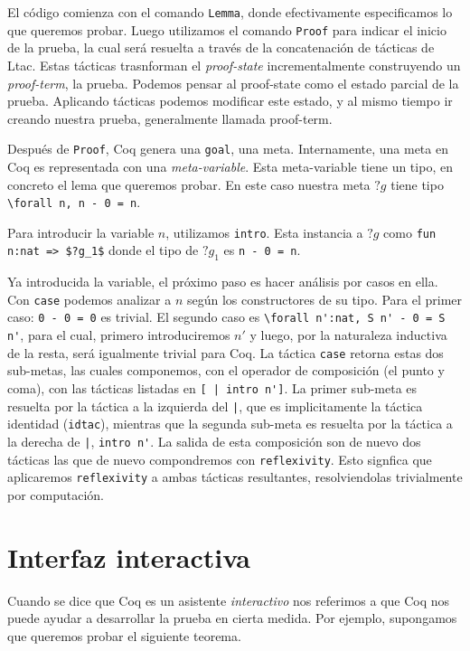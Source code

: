 El código comienza con el comando \lstinline{Lemma}, donde efectivamente especificamos lo que queremos probar.
Luego utilizamos el comando \lstinline{Proof} para indicar el inicio de la prueba, la cual será resuelta a través de la concatenación de tácticas de Ltac. Estas tácticas trasnforman el \textit{proof-state} incrementalmente construyendo un \textit{proof-term}, la prueba. Podemos pensar al proof-state como el estado parcial de la prueba. Aplicando tácticas podemos modificar este estado, y al mismo tiempo ir creando nuestra prueba, generalmente llamada proof-term.

Después de \lstinline{Proof}, Coq genera una \lstinline{goal}, una meta. Internamente, una meta en Coq es representada con una \textit{meta-variable}. Esta meta-variable tiene un tipo, en concreto el lema que queremos probar. En este caso nuestra meta $?g$ tiene tipo \lstinline{\forall n, n - 0 = n}.

Para introducir la variable $n$, utilizamos \lstinline{intro}. Esta instancia a $?g$ como \lstinline{fun n:nat => $?g_1$} donde el tipo de $?g_1$ es \lstinline{n - 0 = n}.

Ya introducida la variable, el próximo paso es hacer análisis por casos en ella. Con \lstinline{case} podemos analizar a $n$ según los constructores de su tipo. Para el primer caso: \lstinline{0 - 0 = 0} es trivial. El segundo caso es \lstinline{\forall n':nat, S n' - 0 = S n'}, para el cual, primero introduciremos $n'$ y luego, por la naturaleza inductiva de la resta, será igualmente trivial para Coq. La táctica \lstinline{case} retorna estas dos sub-metas, las cuales componemos, con el operador de composición (el punto y coma), con las tácticas listadas en \lstinline{[ | intro n']}. La primer sub-meta es resuelta por la táctica a la izquierda del \lstinline{|}, que es implicitamente la táctica identidad (\lstinline{idtac}), mientras que la segunda sub-meta es resuelta por la táctica a la derecha de \lstinline{|}, \lstinline{intro n'}. La salida de esta composición son de nuevo dos tácticas las que de nuevo compondremos con \lstinline{reflexivity}. Esto signfica que aplicaremos \lstinline{reflexivity} a ambas tácticas resultantes, resolviendolas trivialmente por computación.

\section{Interfaz interactiva}

Cuando se dice que Coq es un asistente \textit{interactivo} nos referimos a que Coq nos puede ayudar a desarrollar la prueba en cierta medida.
Por ejemplo, supongamos que queremos probar el siguiente teorema.

